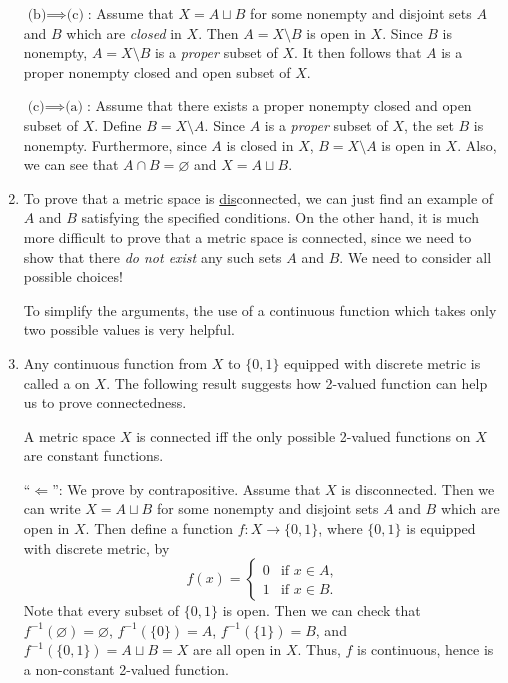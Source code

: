 \begin{enumerate}
\begin{pf}
\underline{\(\text{(b)}\implies \text{(c)}\)}: Assume that \(X=A\sqcup B\) for
some nonempty and disjoint sets \(A\) and \(B\) which are \emph{closed} in
\(X\). Then \(A=X\setminus B\) is open in \(X\). Since \(B\) is nonempty,
\(A=X\setminus B\) is a \emph{proper} subset of \(X\). It then follows that
\(A\) is a proper nonempty closed and open subset of \(X\).

\underline{\(\text{(c)}\implies \text{(a)}\)}: Assume that there exists a
proper nonempty closed and open subset of \(X\). Define \(B=X\setminus A\).
Since \(A\) is a \emph{proper} subset of \(X\), the set \(B\) is nonempty.
Furthermore, since \(A\) is closed in \(X\), \(B=X\setminus A\) is open in
\(X\). Also, we can see that \(A\cap B=\varnothing\) and \(X=A\sqcup B\).
\end{pf}

\item To prove that a metric space is \underline{dis}connected, we can just
find an example of \(A\) and \(B\) satisfying the specified conditions. On the
other hand, it is much more difficult to prove that a metric space is
connected, since we need to show that there \emph{do not exist} any such sets
\(A\) and \(B\). We need to consider all possible choices!

To simplify the arguments, the use of a continuous function which takes only
two possible values is very helpful.

\item Any continuous function from \(X\) to \(\{0,1\}\) equipped with discrete
metric is called a  on \(X\). The following result
suggests how 2-valued function can help us to prove connectedness.

\begin{theorem}
\label{thm:conn-2-val}
A metric space \(X\) is connected iff the only possible 2-valued functions on
\(X\) are constant functions.
\end{theorem}
\begin{pf}
``\(\Leftarrow\)'': We prove by contrapositive. Assume that \(X\) is
disconnected. Then we can write \(X=A\sqcup B\) for some nonempty and disjoint
sets \(A\) and \(B\) which are open in \(X\). Then define a function
\(f:X\to\{0,1\}\), where \(\{0,1\}\) is equipped with discrete metric, by
\[
f(x)=\begin{cases}
0&\text{if \(x\in A\)},\\
1&\text{if \(x\in B\)}.
\end{cases}
\]
Note that every subset of \(\{0,1\}\) is open.  Then we can check that
\(f^{-1}(\varnothing)=\varnothing\), \(f^{-1}(\{0\})=A\), \(f^{-1}(\{1\})=B\), and
\(f^{-1}(\{0,1\})=A\sqcup B=X\) are all open in \(X\). Thus, \(f\) is
continuous, hence is a non-constant 2-valued function.



\end{pf}
\end{enumerate}
